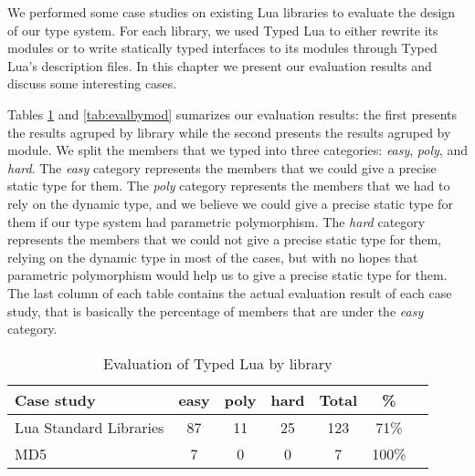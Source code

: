We performed some case studies on existing Lua libraries
to evaluate the design of our type system.
For each library, we used Typed Lua to either rewrite its modules
or to write statically typed interfaces to its modules through
Typed Lua's description files.
In this chapter we present our evaluation results and discuss
some interesting cases.

Tables \ref{tab:evalbylib} and \ref{tab:evalbymod} sumarizes our
evaluation results:
the first presents the results agruped by library while
the second presents the results agruped by module.
We split the members that we typed into three categories:
\emph{easy}, \emph{poly}, and \emph{hard}.
The \emph{easy} category represents the members that we could give
a precise static type for them.
The \emph{poly} category represents the members that we had to
rely on the dynamic type, and we believe we could give a precise
static type for them if our type system had parametric polymorphism.
The \emph{hard} category represents the members that we could not
give a precise static type for them, relying on the dynamic type
in most of the cases, but with no hopes that parametric polymorphism
would help us to give a precise static type for them.
The last column of each table contains the actual evaluation result
of each case study, that is basically the percentage of members
that are under the \emph{easy} category.

\begin{table}[!ht]
\begin{center}
\begin{tabular}{|l|c|c|c|c|c|c|}
\hline
\textbf{Case study} & \textbf{easy} & \textbf{poly} & \textbf{hard} & \textbf{Total} & \textbf{\%} \\
\hline
Lua Standard Libraries & 87 & 11 & 25 & 123 & 71\% \\
\hline
MD5 & 7 & 0 & 0 & 7 & 100\% \\
\hline
\end{tabular}
\end{center}
\caption{Evaluation of Typed Lua by library}
\label{tab:evalbylib}
\end{table}

